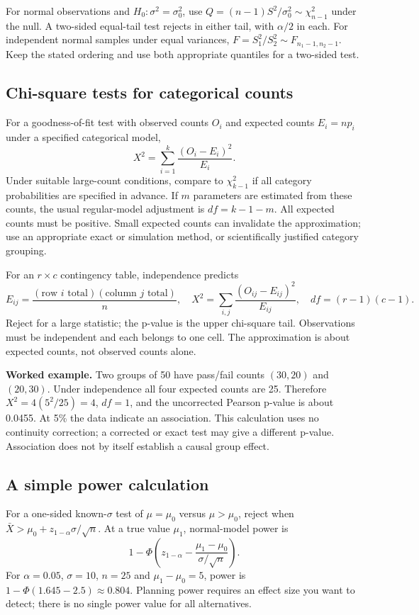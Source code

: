 For normal observations and $H_0:\sigma^2=\sigma_0^2$, use
$Q=(n-1)S^2/\sigma_0^2\sim\chi^2_{n-1}$ under the null. A two-sided
equal-tail test rejects in either tail, with $\alpha/2$ in each.
For independent normal samples under equal variances,
$F=S_1^2/S_2^2\sim F_{n_1-1,n_2-1}$. Keep the stated ordering and use both
appropriate quantiles for a two-sided test.

\subsection{Chi-square tests for categorical counts}
For a goodness-of-fit test with observed counts $O_i$ and expected counts
$E_i=np_i$ under a specified categorical model,
\[
X^2=\sum_{i=1}^k\frac{(O_i-E_i)^2}{E_i}.
\]
Under suitable large-count conditions, compare to $\chi^2_{k-1}$ if all
category probabilities are specified in advance. If $m$ parameters are
estimated from these counts, the usual regular-model adjustment is
$df=k-1-m$. All expected counts must be positive. Small expected counts
can invalidate the approximation; use an appropriate exact or simulation
method, or scientifically justified category grouping.

For an $r\times c$ contingency table, independence predicts
\[
E_{ij}=\frac{(\text{row }i\text{ total})(\text{column }j\text{ total})}{n},
\quad X^2=\sum_{i,j}\frac{(O_{ij}-E_{ij})^2}{E_{ij}},
\quad df=(r-1)(c-1).
\]
Reject for a large statistic; the p-value is the upper chi-square tail.
Observations must be independent and each belongs to one cell. The
approximation is about expected counts, not observed counts alone.

\textbf{Worked example.} Two groups of 50 have pass/fail counts
$(30,20)$ and $(20,30)$. Under independence all four expected counts are 25.
Therefore $X^2=4(5^2/25)=4$, $df=1$, and the uncorrected Pearson p-value is
about 0.0455. At 5\% the data indicate an association. This calculation uses
no continuity correction; a corrected or exact test may give a different
p-value. Association does not by itself establish a causal group effect.

\subsection{A simple power calculation}
For a one-sided known-$\sigma$ test of $\mu=\mu_0$ versus $\mu>\mu_0$, reject
when $\bar X>\mu_0+z_{1-\alpha}\sigma/\sqrt n$.
At a true value $\mu_1$, normal-model power is
\[
1-\Phi\left(z_{1-\alpha}-\frac{\mu_1-\mu_0}{\sigma/\sqrt n}\right).
\]
For $\alpha=0.05$, $\sigma=10$, $n=25$ and $\mu_1-\mu_0=5$, power is
$1-\Phi(1.645-2.5)\approx0.804$. Planning power requires an effect size you
want to detect; there is no single power value for all alternatives.

